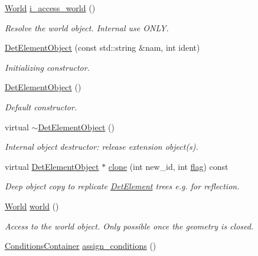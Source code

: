 \begin{DoxyCompactItemize}
\hyperlink{class_d_d4hep_1_1_geometry_1_1_world}{World} \hyperlink{class_d_d4hep_1_1_geometry_1_1_det_element_object_af8e12445511be14deaedd157bd8ddbd6}{i\_\-access\_\-world} ()
\begin{DoxyCompactList}\small\item\em Resolve the world object. Internal use ONLY. \item\end{DoxyCompactList}\item 
\hyperlink{class_d_d4hep_1_1_geometry_1_1_det_element_object_a2001d9608badcd67be58cdf9e8092ee8}{DetElementObject} (const std::string \&nam, int ident)
\begin{DoxyCompactList}\small\item\em Initializing constructor. \item\end{DoxyCompactList}\item 
\hyperlink{class_d_d4hep_1_1_geometry_1_1_det_element_object_ab96898101ad9db1eb508106a0b6bd6ab}{DetElementObject} ()
\begin{DoxyCompactList}\small\item\em Default constructor. \item\end{DoxyCompactList}\item 
virtual \hyperlink{class_d_d4hep_1_1_geometry_1_1_det_element_object_a96c026595b89aa43a03d2406c52a778d}{$\sim$DetElementObject} ()
\begin{DoxyCompactList}\small\item\em Internal object destructor: release extension object(s). \item\end{DoxyCompactList}\item 
virtual \hyperlink{class_d_d4hep_1_1_geometry_1_1_det_element_object}{DetElementObject} $\ast$ \hyperlink{class_d_d4hep_1_1_geometry_1_1_det_element_object_a77b1295a6b9df6064c23376f4d4e8869}{clone} (int new\_\-id, int \hyperlink{class_d_d4hep_1_1_geometry_1_1_det_element_object_abcab90748d7423310fbf73fcc54cef47}{flag}) const 
\begin{DoxyCompactList}\small\item\em Deep object copy to replicate \hyperlink{class_d_d4hep_1_1_geometry_1_1_det_element}{DetElement} trees e.g. for reflection. \item\end{DoxyCompactList}\item 
\hyperlink{class_d_d4hep_1_1_geometry_1_1_world}{World} \hyperlink{class_d_d4hep_1_1_geometry_1_1_det_element_object_aab07042df4ed702bedeb898bf17c180f}{world} ()
\begin{DoxyCompactList}\small\item\em Access to the world object. Only possible once the geometry is closed. \item\end{DoxyCompactList}\item 
\hyperlink{class_d_d4hep_1_1_conditions_1_1_container}{ConditionsContainer} \hyperlink{class_d_d4hep_1_1_geometry_1_1_det_element_object_af14fab1a6caabaad84336f6312ae5617}{assign\_\-conditions} ()
\end{DoxyCompactItemize}


